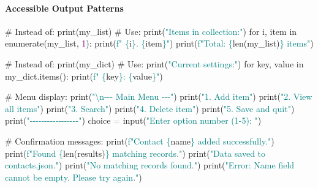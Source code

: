 \documentclass[
  justified,
  openright,
]{tufte-book}
\let\subsubsection\paragraph
\let\paragraph\paragraph
\newcommand{\BuiltInTok}[1]{#1}
\newcommand{\CharTok}[1]{\textcolor{Teal}{#1}}
\newcommand{\CommentTok}[1]{\textcolor{MidGray}{#1}}
\newcommand{\ControlFlowTok}[1]{\textcolor{BrandBlue}{#1}}
\newcommand{\DecValTok}[1]{\textcolor{Purple}{#1}}
\newcommand{\KeywordTok}[1]{\textcolor{BrandBlue}{#1}}
\newcommand{\NormalTok}[1]{#1}
\newcommand{\OperatorTok}[1]{\textcolor{DarkGray}{#1}}
\newcommand{\SpecialCharTok}[1]{\textcolor{Teal}{#1}}
\newcommand{\SpecialStringTok}[1]{\textcolor{Teal}{#1}}
\newcommand{\StringTok}[1]{\textcolor{Teal}{#1}}
\newenvironment{Shaded}{%
  \begin{snugshade}
}{%
  \end{snugshade}
}
\let\subsubsection\paragraph
\let\paragraph\paragraph
\begin{document}
\subsubsection{Accessible Output
Patterns}\label{accessible-output-patterns}

\begin{Shaded}
\begin{Highlighting}[]
\CommentTok{\# Instead of: print(my\_list)}
\CommentTok{\# Use:}
\BuiltInTok{print}\NormalTok{(}\StringTok{"Items in collection:"}\NormalTok{)}
\ControlFlowTok{for}\NormalTok{ i, item }\KeywordTok{in} \BuiltInTok{enumerate}\NormalTok{(my\_list, }\DecValTok{1}\NormalTok{):}
    \BuiltInTok{print}\NormalTok{(}\SpecialStringTok{f"  }\SpecialCharTok{\{}\NormalTok{i}\SpecialCharTok{\}}\SpecialStringTok{. }\SpecialCharTok{\{}\NormalTok{item}\SpecialCharTok{\}}\SpecialStringTok{"}\NormalTok{)}
\BuiltInTok{print}\NormalTok{(}\SpecialStringTok{f"Total: }\SpecialCharTok{\{}\BuiltInTok{len}\NormalTok{(my\_list)}\SpecialCharTok{\}}\SpecialStringTok{ items"}\NormalTok{)}

\CommentTok{\# Instead of: print(my\_dict)}
\CommentTok{\# Use:}
\BuiltInTok{print}\NormalTok{(}\StringTok{"Current settings:"}\NormalTok{)}
\ControlFlowTok{for}\NormalTok{ key, value }\KeywordTok{in}\NormalTok{ my\_dict.items():}
    \BuiltInTok{print}\NormalTok{(}\SpecialStringTok{f"  }\SpecialCharTok{\{}\NormalTok{key}\SpecialCharTok{\}}\SpecialStringTok{: }\SpecialCharTok{\{}\NormalTok{value}\SpecialCharTok{\}}\SpecialStringTok{"}\NormalTok{)}

\CommentTok{\# Menu display:}
\BuiltInTok{print}\NormalTok{(}\StringTok{"}\CharTok{\textbackslash{}n}\StringTok{{-}{-}{-} Main Menu {-}{-}{-}"}\NormalTok{)}
\BuiltInTok{print}\NormalTok{(}\StringTok{"1. Add item"}\NormalTok{)}
\BuiltInTok{print}\NormalTok{(}\StringTok{"2. View all items"}\NormalTok{)}
\BuiltInTok{print}\NormalTok{(}\StringTok{"3. Search"}\NormalTok{)}
\BuiltInTok{print}\NormalTok{(}\StringTok{"4. Delete item"}\NormalTok{)}
\BuiltInTok{print}\NormalTok{(}\StringTok{"5. Save and quit"}\NormalTok{)}
\BuiltInTok{print}\NormalTok{(}\StringTok{"{-}{-}{-}{-}{-}{-}{-}{-}{-}{-}{-}{-}{-}{-}{-}{-}{-}"}\NormalTok{)}
\NormalTok{choice }\OperatorTok{=} \BuiltInTok{input}\NormalTok{(}\StringTok{"Enter option number (1{-}5): "}\NormalTok{)}

\CommentTok{\# Confirmation messages:}
\BuiltInTok{print}\NormalTok{(}\SpecialStringTok{f"Contact \textquotesingle{}}\SpecialCharTok{\{}\NormalTok{name}\SpecialCharTok{\}}\SpecialStringTok{\textquotesingle{} added successfully."}\NormalTok{)}
\BuiltInTok{print}\NormalTok{(}\SpecialStringTok{f"Found }\SpecialCharTok{\{}\BuiltInTok{len}\NormalTok{(results)}\SpecialCharTok{\}}\SpecialStringTok{ matching records."}\NormalTok{)}
\BuiltInTok{print}\NormalTok{(}\StringTok{"Data saved to contacts.json."}\NormalTok{)}
\BuiltInTok{print}\NormalTok{(}\StringTok{"No matching records found."}\NormalTok{)}
\BuiltInTok{print}\NormalTok{(}\StringTok{"Error: Name field cannot be empty. Please try again."}\NormalTok{)}
\end{Highlighting}
\end{Shaded}
\end{document}
